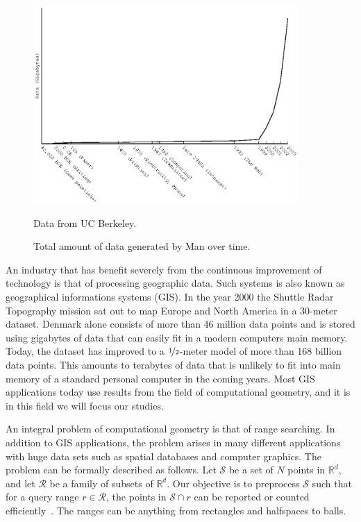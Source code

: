 \documentclass[twoside,11pt,openright]{report}
\begin{document}
\begin{figure}[h]
	\centering
		\includegraphics[width=0.9\textwidth]{../plots/massive_data/massive_data}
	\caption{Total amount of data generated by Man over time.}
	\tiny{Data from UC Berkeley.}
	\label{fig:massive_data}
\end{figure}

An industry that has benefit severely from the continuous improvement of technology is that of processing geographic data. Such systems is also known as geographical informations systems (GIS). In the year 2000 the Shuttle Radar Topography mission sat out to map Europe and North America in a 30-meter dataset. Denmark alone consists of more than 46 million data points and is stored using gigabytes of data that can easily fit in a modern computers main memory. Today, the dataset has improved to a $\nicefrac{1}{2}$-meter model of more than 168 billion data points. This amounts to terabytes of data that is unlikely to fit into main memory of a standard personal computer in the coming years. Most GIS applications today use results from the field of computational geometry, and it is in this field we will focus our studies.

An integral problem of computational geometry is that of range searching. In addition to GIS applications, the problem arises in many different applications with huge data sets such as spatial databases and computer graphics. The problem can be formally described as follows. Let $\mathcal{S}$ be a set of $N$ points in $\mathbb{R}^d$, and let $\mathcal{R}$ be a family of subsets of $\mathbb{R}^d$. Our objective is to preprocess $\mathcal{S}$ such that for a query range $r \in \mathcal{R}$, the points in $\mathcal{S} \cap r$ can be reported or counted efficiently~\cite{Agarwal99geometricrange}. The ranges can be anything from rectangles and halfspaces to balls.
\end{document}
